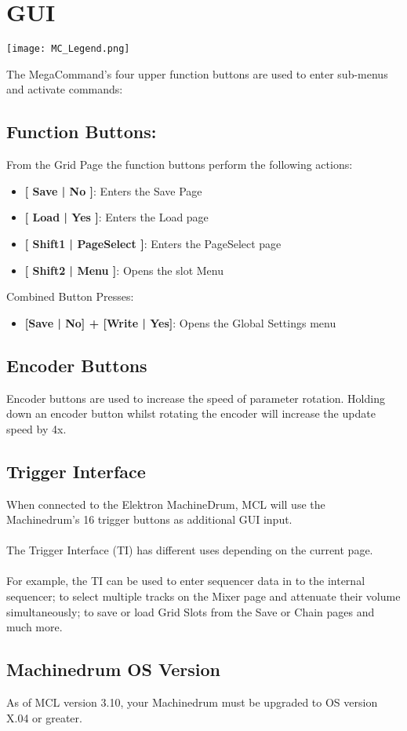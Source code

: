 \chapter{GUI}

\begin{center}
  \texttt{[image: MC\_Legend.png]}
\end{center}

The MegaCommand's four upper function buttons are used to enter sub-menus and activate commands:
\section{Function Buttons:}
From the Grid Page the function buttons perform the following actions:
\begin{itemize}
\item{\textbf{[ Save | No ]}: Enters the Save Page}
\item{\textbf{[ Load | Yes ]}: Enters the Load page}
\item{\textbf{[ Shift1 | PageSelect ]}: Enters the PageSelect page}
\item{\textbf{[ Shift2 | Menu ]}: Opens the slot Menu }
\end{itemize}
Combined Button Presses:
\begin{itemize}
\item{\textbf{[Save | No] + [Write | Yes]}: Opens the Global Settings menu }
\end{itemize}

\section{Encoder Buttons}
Encoder buttons are used to increase the speed of parameter rotation.
Holding down an encoder button whilst rotating the encoder will increase the update speed by 4x.

\section{Trigger Interface}
When connected to the Elektron MachineDrum, MCL will use the Machinedrum's 16 trigger buttons as additional GUI input. \\
\\
The Trigger Interface (TI) has different uses depending on the current page.\\
\\For example, the TI can be used to enter sequencer data in to the internal sequencer;
to select multiple tracks on the Mixer page and attenuate their volume simultaneously; to save or load Grid Slots from the Save or Chain pages and much more.

\section{Machinedrum OS Version}
As of MCL version 3.10, your Machinedrum must be upgraded to OS version X.04 or greater.

